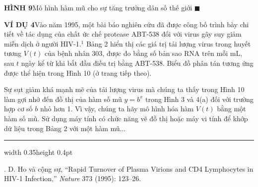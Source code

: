 \begin{minipage}[t]{0.708\textwidth}
\begin{center}
\par\vspace{3pt}
    \parbox{0.96\linewidth}{\fontsize{7.5pt}{9.5pt}\selectfont \textbf{\textsf{HÌNH 9}}\quad Mô hình hàm mũ cho sự tăng trưởng dân số thế giới \hfill{\color{stewartcyan}$\blacksquare$}}
    \end{center}

    \vspace{4pt}
    \noindent
    \textbf{\textsf{\color{stewartcyan}VÍ DỤ 4}}\quad Vào năm 1995, một bài báo nghiên cứu đã được công bố trình bày chi tiết về tác dụng của chất ức chế protease ABT-538 đối với virus gây suy giảm miễn dịch ở người HIV-1.$^1$ Bảng 2 hiển thị các giá trị tải lượng virus trong huyết tương $V(t)$ của bệnh nhân 303, được đo bằng số bản sao RNA trên mỗi mL, sau $t$ ngày kể từ khi bắt đầu điều trị bằng ABT-538. Biểu đồ phân tán tương ứng được thể hiện trong Hình 10 (ở trang tiếp theo).
    
    Sự sụt giảm khá mạnh mẽ của tải lượng virus mà chúng ta thấy trong Hình 10 làm gợi nhớ đến đồ thị của hàm số mũ $y = b^x$ trong Hình 3 và 4(a) đối với trường hợp cơ số $b$ nhỏ hơn 1. Vì vậy, chúng ta hãy mô hình hóa hàm $V(t)$ bằng một hàm số mũ. Sử dụng máy tính có chức năng vẽ đồ thị hoặc máy vi tính để khớp dữ liệu trong Bảng 2 với một hàm mũ...

    \vspace{1.2em}
    \hrule width 0.35\textwidth height 0.4pt
    \vspace{4pt}
    {\fontsize{7.2pt}{9pt}. D. Ho và cộng sự, “Rapid Turnover of Plasma Virions and CD4 Lymphocytes in HIV-1 Infection,” \textit{Nature} 373 (1995): 123--26.\par}
\end{minipage}